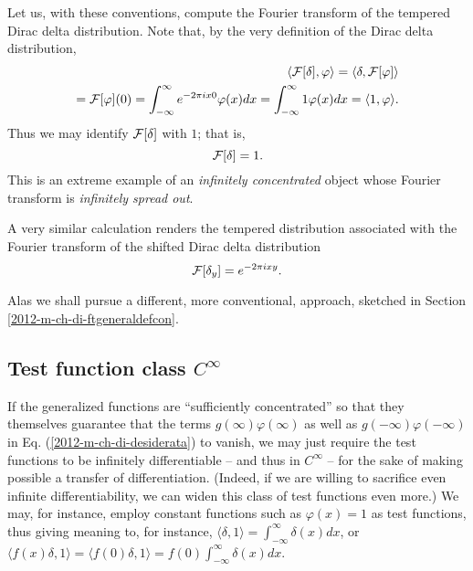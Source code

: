 {
\color{blue}
\bexample
Let us, with these conventions, compute the Fourier transform of the tempered Dirac delta distribution.
Note that, by the very definition of the  Dirac delta distribution,
\begin{equation}
\begin{split}
\langle    {\cal F}[\delta  ] , \varphi \rangle
=
\langle   \delta , {\cal F}[\varphi ]\rangle
\\ =
{\cal F}[\varphi](0)=  \int_{-\infty}^\infty  e^{- 2\pi ix 0} \varphi (x) dx
=  \int_{-\infty}^\infty  1 \varphi (x) dx
=  \langle   1 , \varphi \rangle
.
\end{split}
\end{equation}
Thus we may identify  ${\cal F}[\delta  ]$ with $1$; that is,
\begin{equation}
{\cal F}[\delta  ] = 1
.
\end{equation}
This is an extreme example of an {\em infinitely concentrated} object whose Fourier transform is
{\em infinitely spread out}.

A very similar calculation renders the tempered distribution associated with the Fourier transform of the shifted Dirac delta distribution
\begin{equation}
{\cal F}[\delta_y  ] = e^{- 2\pi ix y}
.
\end{equation}
\eexample
}

Alas we shall pursue a different, more conventional, approach, sketched in Section \ref{2012-m-ch-di-ftgeneraldefcon}.

\subsection{Test function class $C^\infty$}

If the generalized functions are ``sufficiently concentrated'' so that they themselves guarantee that the terms
$g(\infty)\varphi(\infty)$ as well as $g(-\infty)\varphi(-\infty)$
in Eq. (\ref{2012-m-ch-di-desiderata}) to vanish,
we may just require the test functions to be infinitely differentiable -- and thus in $C^\infty$ --
for the sake of making possible a transfer of differentiation.
(Indeed, if we are willing to sacrifice even infinite differentiability, we can widen this class of test functions even more.)
We may, for instance, employ constant functions such as $\varphi (x)=1$ as test functions,
thus giving meaning to, for instance,
$\langle \delta , 1\rangle= \int_{-\infty}^\infty \delta (x) dx$,
or
$\langle f(x)\delta , 1\rangle= \langle f(0)\delta , 1\rangle= f(0)\int_{-\infty}^\infty  \delta (x) dx$.

